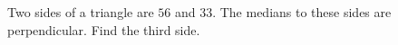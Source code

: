 Two sides of a triangle are $56$ and $33$. The medians to these sides are perpendicular. Find the third side.
